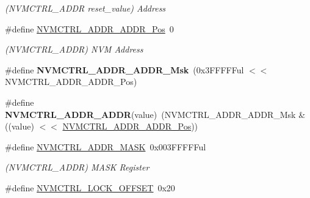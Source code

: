 \begin{DoxyCompactItemize}
\begin{DoxyCompactList}\small\item\em (N\+V\+M\+C\+T\+R\+L\+\_\+\+A\+D\+D\+R reset\+\_\+value) Address \end{DoxyCompactList}\item 
\hypertarget{group___s_a_m_l21___n_v_m_c_t_r_l_ga7af974b171527d13bf216b3d5ef5650b}{}\#define \hyperlink{group___s_a_m_l21___n_v_m_c_t_r_l_ga7af974b171527d13bf216b3d5ef5650b}{N\+V\+M\+C\+T\+R\+L\+\_\+\+A\+D\+D\+R\+\_\+\+A\+D\+D\+R\+\_\+\+Pos}~0\label{group___s_a_m_l21___n_v_m_c_t_r_l_ga7af974b171527d13bf216b3d5ef5650b}

\begin{DoxyCompactList}\small\item\em (N\+V\+M\+C\+T\+R\+L\+\_\+\+A\+D\+D\+R) N\+V\+M Address \end{DoxyCompactList}\item 
\hypertarget{group___s_a_m_l21___n_v_m_c_t_r_l_ga7e4935b01a519044aee16debc2d7118a}{}\#define {\bfseries N\+V\+M\+C\+T\+R\+L\+\_\+\+A\+D\+D\+R\+\_\+\+A\+D\+D\+R\+\_\+\+Msk}~(0x3\+F\+F\+F\+F\+Ful $<$$<$ N\+V\+M\+C\+T\+R\+L\+\_\+\+A\+D\+D\+R\+\_\+\+A\+D\+D\+R\+\_\+\+Pos)\label{group___s_a_m_l21___n_v_m_c_t_r_l_ga7e4935b01a519044aee16debc2d7118a}

\item 
\hypertarget{group___s_a_m_l21___n_v_m_c_t_r_l_ga131b42e625db8057944d4501855bf984}{}\#define {\bfseries N\+V\+M\+C\+T\+R\+L\+\_\+\+A\+D\+D\+R\+\_\+\+A\+D\+D\+R}(value)~(N\+V\+M\+C\+T\+R\+L\+\_\+\+A\+D\+D\+R\+\_\+\+A\+D\+D\+R\+\_\+\+Msk \& ((value) $<$$<$ \hyperlink{group___s_a_m_l21___n_v_m_c_t_r_l_ga7af974b171527d13bf216b3d5ef5650b}{N\+V\+M\+C\+T\+R\+L\+\_\+\+A\+D\+D\+R\+\_\+\+A\+D\+D\+R\+\_\+\+Pos}))\label{group___s_a_m_l21___n_v_m_c_t_r_l_ga131b42e625db8057944d4501855bf984}

\item 
\hypertarget{group___s_a_m_l21___n_v_m_c_t_r_l_gab7e62000f793147227a50fa0217a0efd}{}\#define \hyperlink{group___s_a_m_l21___n_v_m_c_t_r_l_gab7e62000f793147227a50fa0217a0efd}{N\+V\+M\+C\+T\+R\+L\+\_\+\+A\+D\+D\+R\+\_\+\+M\+A\+S\+K}~0x003\+F\+F\+F\+F\+Ful\label{group___s_a_m_l21___n_v_m_c_t_r_l_gab7e62000f793147227a50fa0217a0efd}

\begin{DoxyCompactList}\small\item\em (N\+V\+M\+C\+T\+R\+L\+\_\+\+A\+D\+D\+R) M\+A\+S\+K Register \end{DoxyCompactList}\item 
\hypertarget{group___s_a_m_l21___n_v_m_c_t_r_l_ga7cb3b7118b0cfe9f2279ccb766382275}{}\#define \hyperlink{group___s_a_m_l21___n_v_m_c_t_r_l_ga7cb3b7118b0cfe9f2279ccb766382275}{N\+V\+M\+C\+T\+R\+L\+\_\+\+L\+O\+C\+K\+\_\+\+O\+F\+F\+S\+E\+T}~0x20\label{group___s_a_m_l21___n_v_m_c_t_r_l_ga7cb3b7118b0cfe9f2279ccb766382275}


\end{DoxyCompactItemize}
